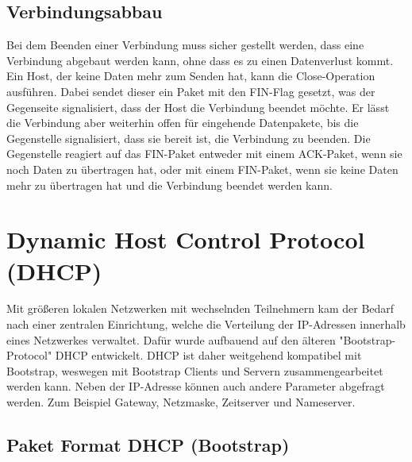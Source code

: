 \subsection{Verbindungsabbau}
Bei dem Beenden einer Verbindung muss sicher gestellt werden, dass eine Verbindung abgebaut werden kann, ohne dass es zu einen Datenverlust kommt. Ein Host, der keine Daten mehr zum Senden hat, kann die Close-Operation ausführen. Dabei sendet dieser ein Paket mit den FIN-Flag gesetzt, was der Gegenseite signalisiert, dass der Host die Verbindung beendet möchte. Er lässt die Verbindung aber weiterhin offen für eingehende Datenpakete, bis die Gegenstelle signalisiert, dass sie bereit ist, die Verbindung zu beenden. Die Gegenstelle reagiert auf das FIN-Paket entweder mit einem ACK-Paket, wenn sie noch Daten zu übertragen hat, oder mit einem FIN-Paket, wenn sie keine Daten mehr zu übertragen hat und die Verbindung beendet werden kann. \cite{TCPr}

\section{Dynamic Host Control Protocol (DHCP)}
Mit größeren lokalen Netzwerken mit wechselnden Teilnehmern kam der Bedarf nach einer zentralen Einrichtung, welche die Verteilung der IP-Adressen innerhalb eines Netzwerkes verwaltet. Dafür wurde aufbauend auf den älteren "{}Bootstrap-Protocol"{} DHCP entwickelt. DHCP ist daher weitgehend kompatibel mit Bootstrap, weswegen mit Bootstrap Clients und Servern zusammengearbeitet werden kann. 
Neben der IP-Adresse können auch andere Parameter abgefragt werden. Zum Beispiel Gateway, Netzmaske, Zeitserver und Nameserver. \cite{DHCPr}



\subsection{Paket Format DHCP (Bootstrap)}

